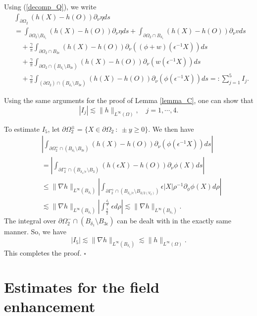 \documentclass[11pt,a4paper]{article}
\numberwithin{equation}{section}
\newcommand{\qed}{\hfill \ensuremath{\square}}
\newcommand{\p}{\partial}
\newcommand{\norm}[1]{\| #1 \|}
\newcommand{\eqnref}[1]{(\ref {#1})}
\newcommand{\Gd}{\delta}
\newcommand{\Ge}{\epsilon}
\newcommand{\Gf}{\phi}
\newcommand{\Gg}{\gamma}
\newcommand{\Gn}{\eta}
\newcommand{\Gr}{\rho}
\newcommand{\GG}{\Gamma}
\newcommand{\GO}{\Omega}
\begin{document}
Using \eqnref{decomp_Q}, we write
\begin{align*}
& \int_{\p \GO_2} (h(X) - h(O)) \p_{\nu} \Gn ds \\
&= \int_{\p\GO_2 \setminus B_{\Gd_1}} (h(X) - h(O)) \p_{\nu} \Gn ds +  \int_{\p \GO_2 \cap B_{\Gd_1}} (h(X) - h(O)) \p_{\nu} v ds \\
&\quad + \frac{\Gg}{\pi} \int_{\p \GO_2 \cap B_{3\Ge}} (h(X) - h(O)) \p_{\nu} \left( \left( \Gf+w \right) \left(\Ge^{-1} X \right)  \right) ds \\
&\quad + \frac{\Gg}{\pi} \int_{\p \GO_2 \cap (B_{\Gd_1} \setminus B_{3\Ge} )} (h(X) - h(O)) \p_{\nu} \left( w (\Ge^{-1} X)\right)  ds \\
&\quad + \frac{\Gg}{\pi} \int_{(\p \GO_2) \cap (B_{\Gd_1} \setminus B_{3\Ge} )}  (h(X) - h(O)) \p_{\nu} ( \Gf (\Ge^{-1} X) ) ds  =: \sum_{j=1}^5 I_j.
\end{align*}

Using the same arguments for the proof of Lemma \ref{lemma_C}, one can show that
$$
|I_j| \lesssim \norm{h}_{L^{\infty} (\GO)}, \quad j=1, \cdots, 4.
$$


To estimate $I_5$, let $\p \GO_2^{\pm} = \{ X \in \p\GO_2 ~:~\pm y \geq 0 \}$.
We then have
\begin{align*}
&\left| \int_{\p \GO_2^+ \cap (B_{\Gd_1} \setminus B_{3\Ge})} (h(X) - h(O)) \p_{\nu} (\Gf (\Ge^{-1} X) ) ds \right| \\
&= \left|\int_{\p \GG_2^+ \cap (B_{\Gd_1/\Ge} \setminus B_{3} )} ( h(\Ge X) - h(O)) \p_{\nu} \Gf (X) ds \right| \\
&\leq \norm{\nabla h} _{L^{\infty} (B_{\delta_1})} \left| \int_{\p \GG_2^+ \cap (B_{\Gd_1/\Ge} \setminus B_{3/2(V_2)} )} \Ge |X|  \Gr^{-1} \p_{\Gf} \Gf(X) d\Gr \right| \\
&\lesssim \norm{\nabla h}_{L^{\infty} (B_{\delta_1})} \left| \int_{\frac 3 2}^{\frac{\Gd_1}{\Ge}}  \Ge d\Gr \right| \lesssim \norm{\nabla h}_{L^{\infty} (B_{\delta_1})} .
\end{align*}
The integral over $\p \GO_2^- \cap (B_{\Gd_1} \setminus B_{3\Ge})$ can be dealt with in the exactly same manner. So, we have
$$
|I_5| \lesssim \norm{\nabla h}_{L^{\infty} (B_{\delta_1})} \lesssim  \norm{ h}_{L^{\infty} (\GO)}.
$$
This completes the proof.
\qed

\section{Estimates for the field enhancement}\label{sec:main}
\end{document}
